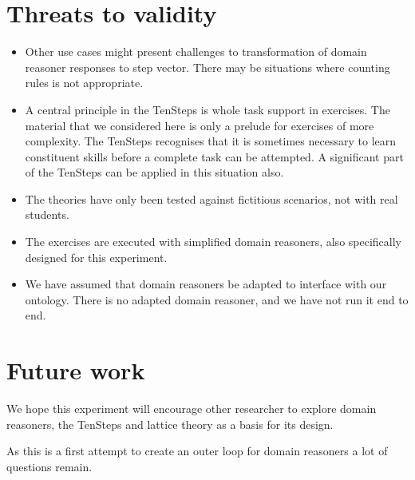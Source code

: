 \section{Threats to validity}
\begin{itemize}
\item Other use cases might present challenges to transformation of domain reasoner responses to step vector.
There may be situations where counting rules is not appropriate.

\item A central principle in the TenSteps is whole task support in exercises.
The material that we considered here is only a prelude for exercises of more complexity.
The TenSteps recognises that it is sometimes necessary to learn constituent skills before a complete task can be attempted.
A significant part of the TenSteps can be applied in this situation also.


\item The theories have only been tested against fictitious scenarios, not with real students.
\item The exercises are executed with simplified domain reasoners, also specifically designed for this experiment.
\item We have assumed that domain reasoners be adapted to interface with our ontology.
There is no adapted domain reasoner, and we have not run it end to end.
\end{itemize}



\section{Future work}

We hope this experiment will encourage other researcher to explore domain reasoners, the TenSteps and lattice theory as a basis for \gls{its} design.

As this is a first attempt to create an outer loop for domain reasoners a lot of questions remain.

